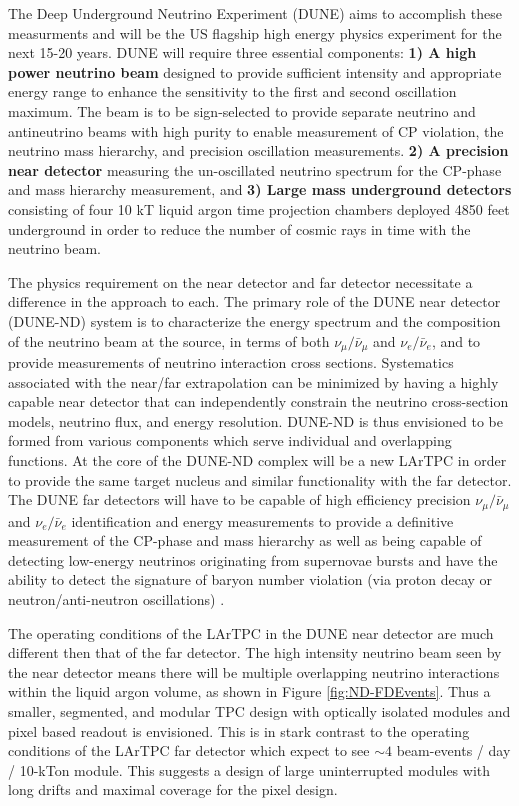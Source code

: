 \documentclass[reprint,amsmath,amssymb,aps,prl,superscriptaddress]{revtex4-1}
\begin{document}
The Deep Underground Neutrino Experiment (DUNE) aims to accomplish these measurments and will be the US flagship high energy physics experiment for the next 15-20 years. DUNE will require three essential components: \textbf{1) A high power neutrino beam} designed to provide sufficient intensity and appropriate energy range to enhance the sensitivity to the first and second oscillation maximum. The beam is to be sign-selected to provide separate neutrino and antineutrino beams with high purity to enable measurement of CP violation, the neutrino mass hierarchy, and precision oscillation measurements. \textbf{2) A precision near detector} measuring the un-oscillated neutrino spectrum for the CP-phase and mass hierarchy measurement, and \textbf{3) Large mass underground detectors} consisting of four 10 kT liquid argon time projection chambers deployed 4850 feet underground in order to reduce the number of cosmic rays in time with the neutrino beam. 

The physics requirement on the near detector and far detector necessitate a difference in the approach to each. The primary role of the DUNE near detector (DUNE-ND) system is to characterize the energy spectrum and the composition of the neutrino beam at the source, in terms of both  ${\nu}_{\mu} / \bar{\nu}_{\mu}$ and ${\nu}_{e} / \bar{\nu}_{e}$, and to provide measurements of neutrino interaction cross sections. Systematics associated with the near/far extrapolation can be minimized by having a highly capable near detector that can independently constrain the neutrino cross-section models, neutrino flux, and energy resolution. DUNE-ND is thus envisioned to be formed from various components which serve individual and overlapping functions. At the core of the DUNE-ND complex will be a new LArTPC in order to provide the same target nucleus and similar functionality with the far detector. The DUNE far detectors will have to be capable of high efficiency precision ${\nu}_{\mu} / \bar{\nu}_{\mu}$ and ${\nu}_{e} / \bar{\nu}_{e}$ identification and energy measurements to provide a definitive measurement of the CP-phase and mass hierarchy as well as being capable of detecting low-energy neutrinos originating from supernovae bursts and have the ability to detect the signature of baryon number violation (via proton decay or neutron/anti-neutron oscillations) \cite{Abi:2018dnh}.

The operating conditions of the LArTPC in the DUNE near detector are much different then that of the far detector.  The high intensity neutrino beam seen by the near detector means there will be multiple overlapping neutrino interactions within the liquid argon volume, as shown in Figure \ref{fig:ND-FDEvents}. Thus a smaller, segmented, and modular TPC design with optically isolated modules and pixel based readout is envisioned. This is in stark contrast to the operating conditions of the LArTPC far detector which expect to see $\sim 4$ beam-events / day / 10-kTon module. This suggests a design of large uninterrupted modules with long drifts and maximal coverage for the pixel design. 
\end{document}
